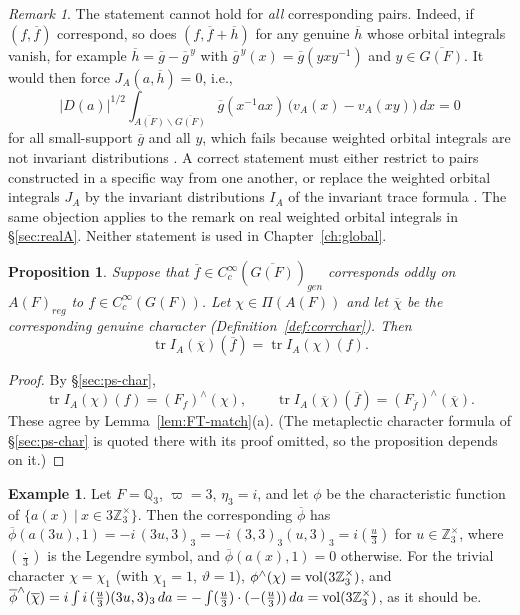 \documentclass[12pt,letterpaper]{book}
\theoremstyle{plain}
\newtheorem{proposition}[theorem]{Proposition}
\theoremstyle{definition}
\newtheorem{example}[theorem]{Example}
\theoremstyle{remark}
\newtheorem{remark}[theorem]{Remark}
\theoremstyle{remark}
\newcommand{\tr}{\operatorname{tr}}
\begin{document}
\begin{remark}\label{rem:weighted-noninv}
The statement cannot hold for \emph{all} corresponding pairs. Indeed, if
$(f,\overline{f})$ correspond, so does $(f,\overline{f}+\overline{h})$
for any genuine $\overline{h}$ whose orbital integrals vanish, for
example $\overline{h}=\overline{g}-\overline{g}^{\,y}$ with
$\overline{g}^{\,y}(x)=\overline{g}(yxy^{-1})$ and $y\in\overline{G(F)}$.
It would then force $J_A(a,\overline{h})=0$, i.e.,
\[
|D(a)|^{1/2}\int_{\overline{A(F)}\backslash\overline{G(F)}}
\overline{g}(x^{-1}ax)\,\bigl(v_A(x)-v_A(xy)\bigr)\,dx=0
\]
for all small-support $\overline{g}$ and all $y$, which fails because
weighted orbital integrals are not invariant distributions
\cite{A7}. A correct statement must either restrict to pairs constructed
in a specific way from one another, or replace the weighted orbital
integrals $J_A$ by the invariant distributions $I_A$ of the invariant
trace formula \cite{A6}. The same objection applies to the remark on
real weighted orbital integrals in \S\ref{sec:realA}. Neither statement
is used in Chapter~\ref{ch:global}.
\end{remark}

\begin{proposition}\label{prop:hyp-ps}
Suppose that $\overline{f}\in C^\infty_c(\overline{G(F)})_{gen}$
corresponds oddly on $A(F)_{reg}$ to
$f\in C_c^\infty(G(F))$. Let $\chi\in\Pi(A(F))$ and let $\overline{\chi}$
be the corresponding genuine character
(Definition~\ref{def:corrchar}). Then
\[
\tr I_A(\overline{\chi})(\overline{f})=\tr I_A(\chi)(f).
\]
\end{proposition}

\begin{proof}
By \S\ref{sec:ps-char},
\[
\tr I_A(\chi)(f)=(F_f)^\wedge(\chi),\qquad
\tr I_A(\overline{\chi})(\overline{f})=(F_{\overline{f}})^\wedge(\overline{\chi}).
\]
These agree by Lemma~\ref{lem:FT-match}(a). (The metaplectic character
formula of \S\ref{sec:ps-char} is quoted there with its proof omitted,
so the proposition depends on it.)
\end{proof}

\begin{example}
Let $F={\mathbb Q}_3$, $\varpi=3$, $\eta_3=i$, and let $\phi$ be the
characteristic function of $\{a(x)\ |\ x\in 3{\mathbb Z}_3^\times\}$.
Then the corresponding $\overline\phi$ has
$\overline{\phi}(a(3u),1)=-i\,(3u,3)_3=-i\,(3,3)_3(u,3)_3=i\left(\frac{u}{3}\right)$
for $u\in{\mathbb Z}_3^\times$, where $(\frac{\cdot}{3})$ is the Legendre
symbol, and $\overline\phi(a(x),1)=0$ otherwise. For the trivial character
$\chi=\chi_1$ (with $\chi_1=1$, $\vartheta=1$), $\phi^\wedge(\chi)={\rm vol}(3{\mathbb Z}_3^\times)$,
and $\overline{\phi}^\wedge(\overline\chi)
=i\int i\,(\tfrac{u}{3})(3u,3)_3\,da=-\int(\tfrac{u}{3})\cdot(-(\tfrac{u}{3}))\,da
={\rm vol}(3{\mathbb Z}_3^\times)$, as it should be.
\end{example}
\end{document}
